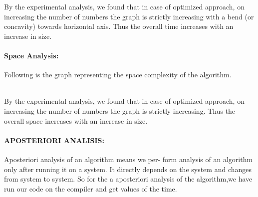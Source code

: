 \documentclass[10pt]{article}
\begin{document}
\begin{multicols*}{2}

By the experimental analysis, we found that in  case of optimized approach, on increasing the number of numbers the graph is strictly increasing with a bend (or concavity) towards horizontal axis. Thus the overall time increases with an increase in size.

\paragraph{Space Analysis:}Following is the graph representing the space complexity of the algorithm.\\\\

By the experimental analysis, we found that in case of optimized approach, on increasing the number of numbers the graph is strictly increasing. Thus the overall space increases with an increase in size.\\

\paragraph{APOSTERIORI ANALISIS:}
Aposteriori analysis of an algorithm means we per- form analysis of an algorithm only after running it on a system. It directly depends on the system and changes from system to system. So for the a aposteriori analysis of the algorithm,we have run our code on the compiler and get values of the time.

\end{multicols*}
\end{document}
